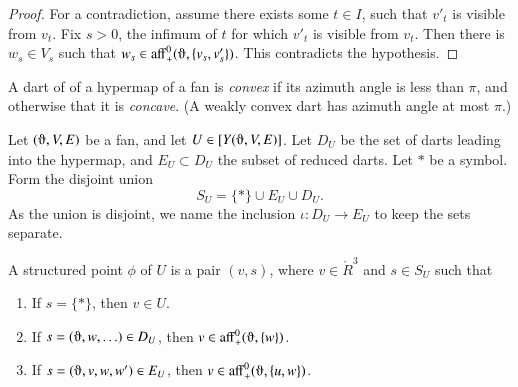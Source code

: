 \begin{proof} For a contradiction, assume there exists some $t\in I$,
such that $v'_t$ is visible from $v_t$.  
Fix $s>0$, the infimum of $t$ for which $v'_t$ is visible
from $v_t$.   Then there is $w_s\in V_s$ such that
$w_s\in \op{aff}_+^0(\orgn,\{v_s,v_s'\})$.  This contradicts the hypothesis.
\end{proof}



\begin{definition}\label{def:concave}
A dart of of a hypermap of a fan is {\it convex\/}
if its azimuth angle is less than $\pi$, and otherwise that it
is {\it concave}.  
(A weakly convex dart has azimuth angle at most $\pi$.)
%
\end{definition}


    \label{sec:proof-2}

\begin{definition}[$S_U$]
Let $(\orgn,V,E)$ be a fan, and let $U\in [Y(\orgn,V,E)]$.  Let $D_U$ be the set of darts leading into the hypermap, and $E_{U}\subset D_U$ the subset of reduced darts.
Let $*$ be a symbol. Form the disjoint union
 $$
 S_U =  \{*\} \cup E_U \cup D_U.
$$
As the union is disjoint, we name the inclusion $\iota:D_U\to E_U$ to keep the sets separate.
\end{definition}



\begin{definition} A structured point $\phi$ of $U$ is a pair $(v,s)$,
where $v\in\ring{R}^3$ and $s\in S_U$ such that
\begin{enumerate}
\item If $s = \{*\}$, then $v \in U$.
\item If $s = (\orgn,w,\ldots)\in D_U$, then $v\in\op{aff}_+^0(\orgn,\{w\})$.
\item If $s=(\orgn,v,w,w')\in E_U$, then $v\in\op{aff}_+^0(\orgn,\{u,w\})$.
\end{enumerate}
\end{definition}

